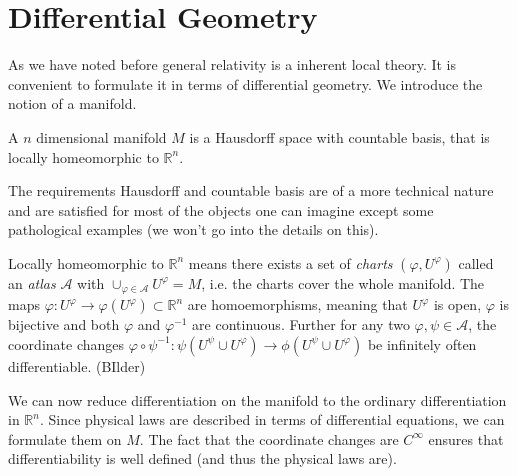\chapter{Differential Geometry}
As we have noted before general relativity is a inherent local theory. It is convenient to formulate it in terms of differential geometry.
We introduce the notion of a manifold.

\begin{definition}
A $n$ dimensional manifold $M$ is a Hausdorff space with countable basis, that
is locally homeomorphic to $\mathbb{R}^n$.
\end{definition}
\begin{remark}
The requirements Hausdorff and countable basis are of a more technical nature and are satisfied for most of the objects one can imagine 
except some pathological examples (we won't go into the details on this).

Locally homeomorphic to $\mathbb{R}^n$ means there exists a set of \emph{charts} 
$(\varphi,U^\varphi)$ called an \emph{atlas} $\mathcal{A}$ with $\cup_{\varphi\in\mathcal{A}} U^\varphi =M$, 
i.e. the charts cover the whole manifold. The maps $\varphi:U^\varphi\to \varphi(U^\varphi)\subset\mathbb{R}^n $ are homoemorphisms, 
meaning that $U^\varphi$ is open, $\varphi$ is bijective and both $\varphi$ and $\varphi^{-1}$ are continuous.
Further for any two $\varphi,\psi\in \mathcal{A}$, the coordinate changes 
$\varphi\circ\psi^{-1}:\psi(U^\psi\cup U^\varphi)\to \phi(U^\psi\cup U^\varphi)$ be infinitely often differentiable.
(BIlder)
\end{remark}

We can now reduce differentiation on the manifold to the ordinary differentiation in $\mathbb{R}^n$. 
Since physical laws are described in terms of differential equations, we can formulate them on $M$. 
The fact that the coordinate changes are $C^\infty$ ensures that differentiability is well defined (and thus the physical laws are).

